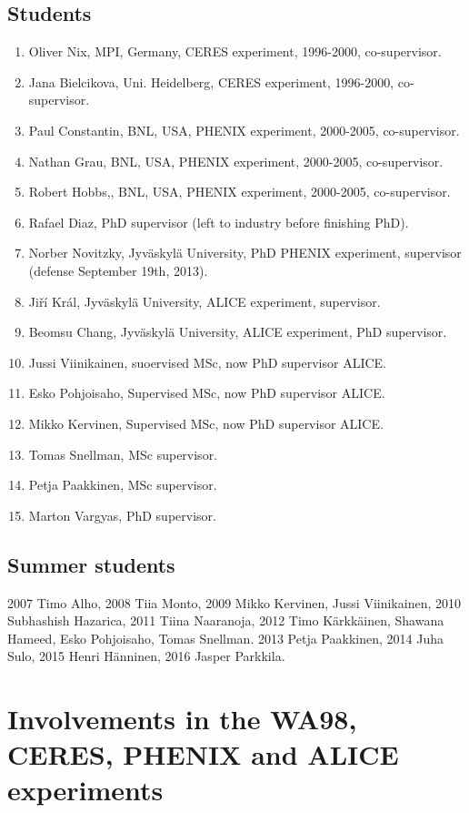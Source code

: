 \documentclass[12pt]{article}
\begin{document}
\subsection{Students}
\begin{enumerate}
\item Oliver Nix, MPI, Germany, CERES experiment, 1996-2000, co-supervisor.
\item Jana Bielcikova, Uni. Heidelberg, CERES experiment, 1996-2000, co-supervisor.
\item Paul Constantin, BNL, USA, PHENIX experiment, 2000-2005, co-supervisor.
\item Nathan Grau, BNL, USA, PHENIX experiment, 2000-2005, co-supervisor.
\item Robert Hobbs,, BNL, USA, PHENIX experiment, 2000-2005, co-supervisor.
\item Rafael Diaz, PhD supervisor (left to industry before finishing PhD).
\item Norber Novitzky, Jyv\"askyl\"a University, PhD PHENIX experiment, supervisor (defense September 19th, 2013).
\item Ji\v{r}\'i Kr\'al, Jyv\"askyl\"a University, ALICE experiment, supervisor.
\item Beomsu Chang, Jyv\"askyl\"a University, ALICE experiment, PhD supervisor.
\item Jussi Viinikainen, suoervised MSc, now PhD supervisor ALICE.
\item Esko Pohjoisaho, Supervised MSc, now PhD supervisor ALICE.
\item Mikko Kervinen, Supervised MSc, now PhD supervisor ALICE.
\item Tomas Snellman, MSc supervisor.
\item Petja Paakkinen, MSc supervisor.
\item Marton Vargyas, PhD supervisor.
\end{enumerate}

\subsection{Summer students}
2007 Timo Alho, 2008 Tiia Monto, 2009 Mikko Kervinen, Jussi Viinikainen, 2010 Subhashish Hazarica, 2011 Tiina Naaranoja, 2012	 Timo K\"arkk\"ainen, Shawana Hameed, Esko Pohjoisaho, Tomas Snellman. 2013 Petja Paakkinen,
2014 Juha Sulo, 2015 Henri H\"anninen, 2016 Jasper Parkkila.


\section{Involvements in the WA98, CERES, PHENIX  and ALICE experiments}
\end{document}
